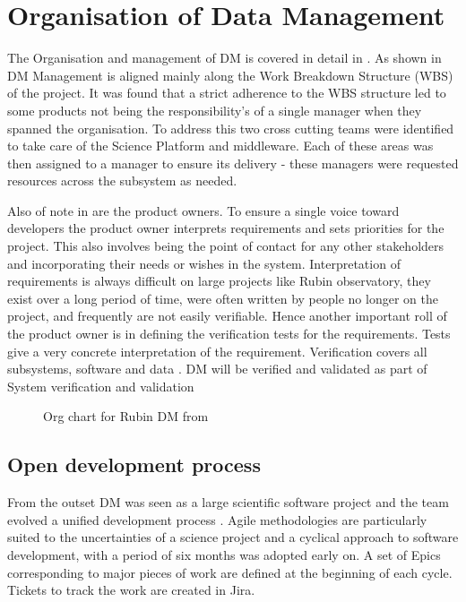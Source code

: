 
\section{Organisation of Data Management} \label{sec:org}

The Organisation and management of DM is covered in detail in \citet{LDM-294}.
As shown in  DM Management is aligned mainly along the Work Breakdown Structure (WBS) of the project.
It was found that a strict adherence to the WBS structure led to some products not being the responsibility's of a single manager when they spanned the organisation.
To address this two cross cutting teams were identified  to take care of the Science Platform and middleware.
Each of these areas was then assigned to a manager to ensure its delivery - these managers were requested resources across the subsystem as needed.

Also of note in  are the product owners.
To ensure a single voice toward developers the product owner interprets requirements and sets priorities for the
project.
This also involves being the point of contact for any other stakeholders and incorporating their needs or wishes in the system.
Interpretation of requirements is always difficult on large projects like Rubin observatory, they exist over a long period of time, were often written by people no longer on the project, and frequently are not easily verifiable.
Hence another important roll of the product owner is in defining the verification tests for the requirements.
Tests give a very concrete interpretation of the requirement.
Verification covers all subsystems, software and data  \citep{PSTN-024}.
  DM will be verified and validated as part of System verification and validation \citep{2014SPIE.9150E..0NS,PSTN-029}



\begin{figure}
\caption{Org chart for Rubin DM from \citet{LDM-294}\label{fig:org}}
\end{figure}

\subsection{Open development process}\label{sec:devproc}

From the outset DM was seen as a large scientific software project and the team evolved a unified development process \citep{2018SPIE10707E..09J}.
Agile methodologies \citep{it:agile}  are particularly suited to the uncertainties of a science project and
a cyclical approach to software development, with a period of six months was adopted early on.
A set of Epics corresponding to major pieces of work are defined at the beginning of each cycle.
Tickets to track the work are created in Jira.

